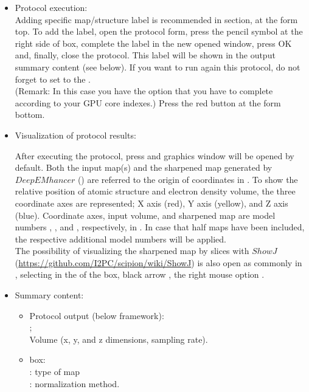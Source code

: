 \begin{itemize}
    \item Protocol execution:\\
  Adding specific map/structure label is recommended in  section, at the form top. To add the label, open the protocol form, press the pencil symbol at the right side of  box, complete the label in the new opened window, press OK and, finally, close the protocol. This label will be shown in the output summary content (see below). If you want to run again this protocol, do not forget to set to  the .\\
  (Remark: In this case you have the option  that you have to complete according to your GPU core indexes.)
  Press the  red button at the form bottom.
  
  \item Visualization of protocol results:
  
  After executing the protocol, press  and \chimera graphics window will be opened by default. Both the input map(s) and the sharpened map generated by $DeepEMhancer$ () are referred to the origin of coordinates in \chimera. To show the relative position of atomic structure and electron density volume, the three coordinate axes are represented; X axis (red), Y axis (yellow), and Z axis (blue). Coordinate axes, input volume, and sharpened map are model numbers ,  , and , respectively, in \chimera {}. In case that half maps have been included, the respective additional model numbers will be applied.\\
  
  The possibility of visualizing the sharpened map by slices with $ShowJ$ (\url{https://github.com/I2PC/scipion/wiki/ShowJ}) is also open as commonly in \scipion, selecting in the  of the  box, black arrow , the right mouse option . 
  
  \item Summary content:
  \begin{itemize}
     \item Protocol output (below \scipion framework):\\ ;\\ Volume (x, y, and z dimensions, sampling rate).
     \item {} box:\\ : type of map\\ : normalization method.
  \end{itemize}
    
\end{itemize}

